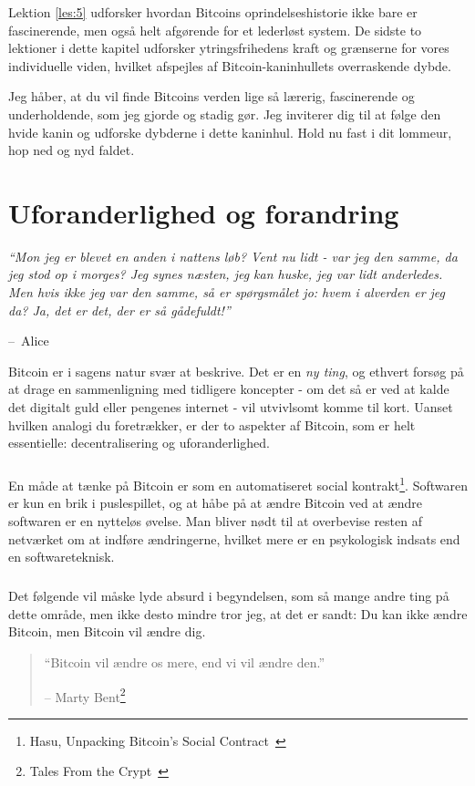 \documentclass[paper=6in:9in,pagesize=pdftex,
               headinclude=on,footinclude=on,12pt]{scrbook}
\makeatletter
\newenvironment{chapquote}[2][4em]{\setlength{\@tempdima}{#1}%
   \def\chapquote@author{#2}%
   \parshape 1 \@tempdima \dimexpr\textwidth-2\@tempdima\relax%
   \itshape}{\par\normalfont\hfill--\ \chapquote@author\hspace*{\@tempdima}\par\bigskip}
\makeatother
\begin{document}
Lektion \ref{les:5} udforsker hvordan Bitcoins oprindelseshistorie ikke bare er fascinerende, men også helt afgørende for et lederløst system. De sidste to lektioner i dette kapitel udforsker ytringsfrihedens kraft og grænserne for vores individuelle viden, hvilket afspejles af Bitcoin-kaninhullets overraskende dybde.

Jeg håber, at du vil finde Bitcoins verden lige så lærerig, fascinerende og underholdende, som jeg gjorde og stadig gør. Jeg inviterer dig til at følge den hvide kanin og udforske dybderne i dette kaninhul. Hold nu fast i dit lommeur, hop ned og nyd faldet. 
\chapter{Uforanderlighed og forandring}
\label{les:1}

\begin{chapquote}{Alice} \enquote{Mon jeg er blevet en anden i nattens løb? Vent nu lidt - var jeg den samme, da jeg stod op i morges? Jeg synes næsten, jeg kan huske, jeg var lidt anderledes. Men hvis ikke jeg var den samme, så er spørgsmålet jo: hvem i alverden er jeg da? Ja, det er det, der er så gådefuldt!} \end{chapquote}

Bitcoin er i sagens natur svær at beskrive. Det er en \textit{ny ting}, og ethvert forsøg på at drage en sammenligning med tidligere koncepter - om det så er ved at kalde det digitalt guld eller pengenes internet - vil utvivlsomt komme til kort. Uanset hvilken analogi du foretrækker, er der to aspekter af Bitcoin, som er helt essentielle: decentralisering og uforanderlighed.\paragraph{} En måde at tænke på Bitcoin er som en automatiseret social kontrakt\footnote{Hasu, Unpacking Bitcoin's Social Contract~\cite{social-contract}}. Softwaren er kun en brik i puslespillet, og at håbe på at ændre Bitcoin ved at ændre softwaren er en nytteløs øvelse. Man bliver nødt til at overbevise resten af netværket om at indføre ændringerne, hvilket mere er en psykologisk indsats end en softwareteknisk.\paragraph{} Det følgende vil måske lyde absurd i begyndelsen, som så mange andre ting på dette område, men ikke desto mindre tror jeg, at det er sandt: Du kan ikke ændre Bitcoin, men Bitcoin vil ændre dig.\begin{quotation}\begin{samepage} \enquote{Bitcoin vil ændre os mere, end vi vil ændre den.} \begin{flushright} -- Marty Bent\footnote{Tales From the Crypt~\cite{tftc21}}
\end{flushright}\end{samepage}\end{quotation}
\end{document}
